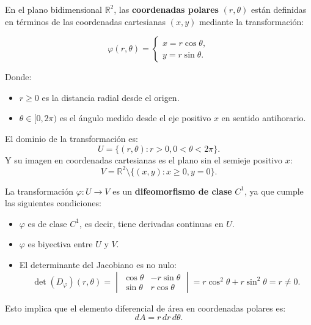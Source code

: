 \begin{definición}
En el plano bidimensional $\mathbb{R}^2$, las \textbf{coordenadas polares} $(r, \theta)$ están definidas en términos de las coordenadas cartesianas $(x, y)$ mediante la transformación:

\begin{minipage}{0.5\textwidth}
    \[
        \varphi(r, \theta) =
        \begin{cases}
            x = r\cos\theta, \\
            y = r\sin\theta.
        \end{cases}
    \]
\end{minipage}
\begin{minipage}{0.5\textwidth}
    \centering
    
\end{minipage}

Donde:
\begin{itemize}
    \item $r \geq 0$ es la distancia radial desde el origen.
    \item $\theta \in [0, 2\pi)$ es el ángulo medido desde el eje positivo $x$ en sentido antihorario.
\end{itemize}

El dominio de la transformación es: $$ U = \{(r, \theta) : r > 0, 0 < \theta <
    2\pi\}. $$ Y su imagen en coordenadas cartesianas es el plano sin el semieje
positivo $x$: $$ V = \mathbb{R}^2 \setminus \{ (x,y) : x \geq 0, y = 0\}. $$

La transformación $\varphi: U \to V$ es un \textbf{difeomorfismo de clase}
$C^1$, ya que cumple las siguientes condiciones:
\begin{itemize}
    \item $\varphi$ es de clase $C^1$, es decir, tiene derivadas continuas en $U$.
    \item $\varphi$ es biyectiva entre $U$ y $V$.
    \item El determinante del Jacobiano es no nulo: $$ \det(D_{\varphi})(r, \theta) =
              \begin{vmatrix}
                  \cos\theta & -r\sin\theta \\
                  \sin\theta & r\cos\theta
              \end{vmatrix} = r\cos^2\theta + r\sin^2\theta = r \neq 0.
          $$
\end{itemize}
Esto implica que el elemento diferencial de área en coordenadas polares es:
$$
    dA = r \, dr \, d\theta.
$$
\end{definición}

